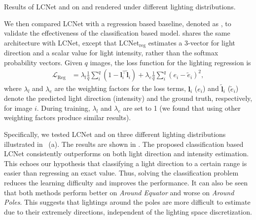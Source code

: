 \begin{table}[tbp] \centering
    \caption[Results on  and  under different lighting distributions]{Results of LCNet and \LCNetreg on  and  rendered under different lighting distributions.} \label{tab:quant_light_synth_regression}
     
\end{table}

We then compared LCNet with a regression based baseline, denoted as \LCNetreg, to validate the effectiveness of the classification based model.
\LCNetreg shares the same architecture with LCNet, except that LCNet$_{\text{reg}}$ estimates a 3-vector for light direction and a scalar value for light intensity, rather than the softmax probability vectors.
 Given $q$ images, the loss function for the lighting regression is
 \begin{align}
     \label{eq:loss_reg}
     \mathcal{L}_{\text{Reg}} & = \lambda_{l} \frac{1}{q} \sum_{i}^q (1 - \boldsymbol{l}_{i}^\top \tilde{\boldsymbol{l}}_{i} )+ \lambda_{e} \frac{1}{q} \sum_{i}^q (e_{i} - \tilde{e}_{i} )^2,
 \end{align}
 where $\lambda_{l}$ and $\lambda_{e}$ are the weighting factors for the loss terms, $\boldsymbol{l}_{i}$ ($e_{i}$) and $\tilde{\boldsymbol{l}}_{i}$ ($\tilde{e}_{i}$) denote the predicted light direction (intensity) and the ground truth, respectively, for image $i$. During training, $\lambda_{l}$ and $\lambda_{e}$ are set to 1 (we found that using other weighting factors produce similar results).


Specifically, we tested LCNet and \LCNetreg on three different lighting distributions illustrated in ~(a). The results are shown in . The proposed classification based LCNet consistently outperforms \LCNetreg on both light direction and intensity estimation. This echoes our hypothesis that classifying a light direction to a certain range is easier than regressing an exact value. Thus, solving the classification problem reduces the learning difficulty and improves the performance.
It can also be seen that both methods perform better on \textit{Around Equator} and worse on \textit{Around Poles}.
This suggests that lightings around the poles are more difficult to estimate due to their extremely directions, independent of the lighting space discretization.

